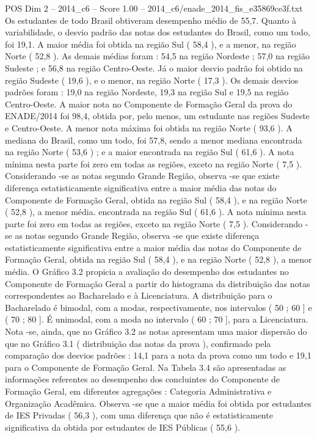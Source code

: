 \begin{textsample}{POS Dim 2 – 2014\_c6 – Score 1.00 – 2014\_c6/enade\_2014\_fis\_e35869ce3f.txt}
Os estudantes de todo Brasil obtiveram desempenho médio de 55,7.
Quanto à variabilidade, o desvio padrão das notas dos estudantes do Brasil, como um todo, foi 19,1.
A maior média foi obtida na região Sul ( 58,4 ), e a menor, na região Norte ( 52,8 ).
As demais médias foram : 54,5 na região Nordeste ; 57,0 na região Sudeste ; e 56,8 na região Centro-Oeste.
Já o maior desvio padrão foi obtido na região Sudeste ( 19,6 ), e o menor, na região Norte ( 17,3 ).
Os demais desvios padrões foram : 19,0 na região Nordeste, 19,3 na região Sul e 19,5 na região Centro-Oeste.
A maior nota no Componente de Formação Geral da prova do ENADE/2014 foi 98,4, obtida por, pelo menos, um estudante nas regiões Sudeste e Centro-Oeste.
A menor nota máxima foi obtida na região Norte ( 93,6 ).
A mediana do Brasil, como um todo, foi 57,8, sendo a menor mediana encontrada na região Norte ( 53,6 ) ; e a maior encontrada na região Sul ( 61,6 ).
A nota mínima nesta parte foi zero em todas as regiões, exceto na região Norte ( 7,5 ).
Considerando -se as notas segundo Grande Região, observa -se que existe diferença estatisticamente significativa entre a maior média das notas do Componente de Formação Geral, obtida na região Sul ( 58,4 ), e na região Norte ( 52,8 ), a menor média. encontrada na região Sul ( 61,6 ).
A nota mínima nesta parte foi zero em todas as regiões, exceto na região Norte ( 7,5 ).
Considerando -se as notas segundo Grande Região, observa -se que existe diferença estatisticamente significativa entre a maior média das notas do Componente de Formação Geral, obtida na região Sul ( 58,4 ), e na região Norte ( 52,8 ), a menor média.
O Gráfico 3.2 propicia a avaliação do desempenho dos estudantes no Componente de Formação Geral a partir do histograma da distribuição das notas correspondentes ao Bacharelado e à Licenciatura.
A distribuição para o Bacharelado é bimodal, com a modas, respectivamente, nos intervalos ( 50 ; 60 ] e ( 70 ; 80 ].
É unimodal, com a moda no intervalo ( 60 ; 70 ], para a Licenciatura.
Nota -se, ainda, que no Gráfico 3.2 as notas apresentam uma maior dispersão do que no Gráfico 3.1 ( distribuição das notas da prova ), confirmado pela comparação dos desvios padrões : 14,1 para a nota da prova como um todo e 19,1 para o Componente de Formação Geral.
Na Tabela 3.4 são apresentadas as informações referentes ao desempenho dos concluintes do Componente de Formação Geral, em diferentes agregações : Categoria Administrativa e Organização Acadêmica.
Observa -se que a maior média foi obtida por estudantes de IES Privadas ( 56,3 ), com uma diferença que não é estatisticamente significativa da obtida por estudantes de IES Públicas ( 55,6 ).

\end{textsample}

